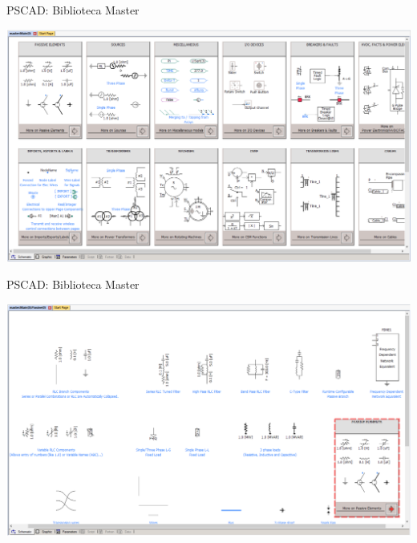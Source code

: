 \begin{frame}{PSCAD: Biblioteca Master}
\centering


\includegraphics[width=0.85\linewidth]{./figuras/Primeiros-Passos/biblioteca_master}


\end{frame}




\begin{frame}{PSCAD: Biblioteca Master}
\centering


\includegraphics[width=0.85\linewidth]{./figuras/Primeiros-Passos/biblioteca_parte}


\end{frame}





